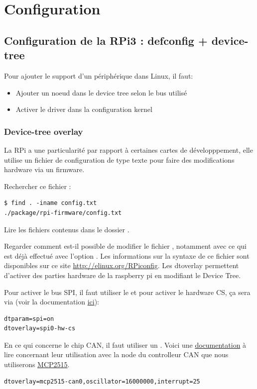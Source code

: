 \section{Configuration}
\subsection{Configuration de la RPi3 : defconfig + device-tree}

Pour ajouter le support d'un périphérique dans Linux, il faut:
\begin{itemize}
\item Ajouter un noeud dans le device tree selon le bus utilisé
\item Activer le driver dans la configuration kernel
\end{itemize}

\subsubsection{Device-tree overlay}

La RPi a une particularité par rapport à certaines cartes de développpement,
elle utilise un fichier de configuration de type texte pour faire des
modifications hardware via un firmware.

Rechercher ce fichier :

\begin{verbatim}
$ find . -iname config.txt
./package/rpi-firmware/config.txt
\end{verbatim}

Lire les fichiers contenus dans le dossier .

Regarder comment est-il possible de modifier le fichier ,
notamment avec ce qui est déjà effectué avec l'option .
Les informations sur la syntaxe de ce fichier sont disponibles sur ce site
\url{http://elinux.org/RPiconfig}. Les dtoverlay permettent d'activer des
parties hardware de la raspberry pi en modifiant le Device Tree.

Pour activer le bus SPI, il faut utiliser le  et pour activer le
hardware CS, ça sera via  (voir la documentation \href{https://github.com/raspberrypi/firmware/blob/master/boot/overlays/README#L2103..L2106}{ici}):
\begin{verbatim}
dtparam=spi=on
dtoverlay=spi0-hw-cs
\end{verbatim}

En ce qui concerne le chip CAN, il faut utiliser un .
Voici une \href{https://github.com/raspberrypi/firmware/blob/master/boot/overlays/README#L56}{documentation}
à lire concernant leur utilisation avec la node du controlleur CAN que nous
utiliserons \href{https://github.com/raspberrypi/firmware/blob/master/boot/overlays/README#L1478..L1485}{MCP2515}.
\begin{verbatim}
dtoverlay=mcp2515-can0,oscillator=16000000,interrupt=25
\end{verbatim}

